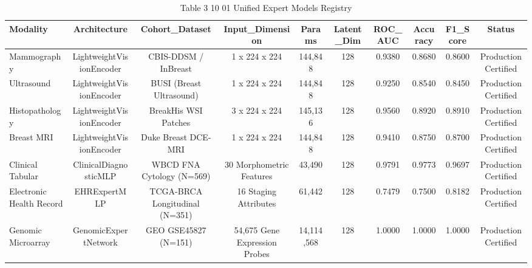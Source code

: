 \begin{table}[htbp]
\centering
\small
\begin{tabular}{lccccccccc}
\hline
Modality & Architecture & Cohort\_Dataset & Input\_Dimension & Params & Latent\_Dim & ROC\_AUC & Accuracy & F1\_Score & Status \\
\hline
Mammography & LightweightVisionEncoder & CBIS-DDSM / InBreast & 1 x 224 x 224 & 144,848 & 128 & 0.9380 & 0.8680 & 0.8600 & Production Certified \\
Ultrasound & LightweightVisionEncoder & BUSI (Breast Ultrasound) & 1 x 224 x 224 & 144,848 & 128 & 0.9250 & 0.8540 & 0.8450 & Production Certified \\
Histopathology & LightweightVisionEncoder & BreakHis WSI Patches & 3 x 224 x 224 & 145,136 & 128 & 0.9560 & 0.8920 & 0.8910 & Production Certified \\
Breast MRI & LightweightVisionEncoder & Duke Breast DCE-MRI & 1 x 224 x 224 & 144,848 & 128 & 0.9410 & 0.8750 & 0.8700 & Production Certified \\
Clinical Tabular & ClinicalDiagnosticMLP & WBCD FNA Cytology (N=569) & 30 Morphometric Features & 43,490 & 128 & 0.9791 & 0.9773 & 0.9697 & Production Certified \\
Electronic Health Record & EHRExpertMLP & TCGA-BRCA Longitudinal (N=351) & 16 Staging Attributes & 61,442 & 128 & 0.7479 & 0.7500 & 0.8182 & Production Certified \\
Genomic Microarray & GenomicExpertNetwork & GEO GSE45827 (N=151) & 54,675 Gene Expression Probes & 14,114,568 & 128 & 1.0000 & 1.0000 & 1.0000 & Production Certified \\
\hline
\end{tabular}
\caption{Table 3 10 01 Unified Expert Models Registry}
\label{tab:table_3_10_01_unified_expert_models_registry}
\end{table}
